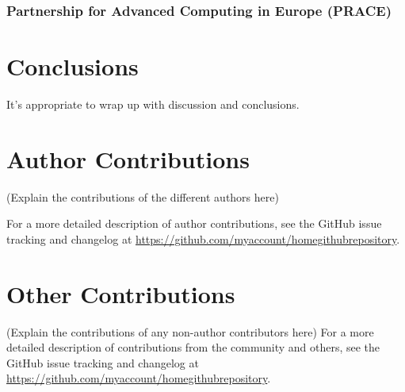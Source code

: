 \documentclass[9pt,review]{livecoms}
\newcommand{\githubrepository}{\url{https://github.com/myaccount/homegithubrepository}}  %
\begin{document}
\subsubsection{Partnership for Advanced Computing in Europe (PRACE)}



\section{Conclusions}

It's appropriate to wrap up with discussion and conclusions.





\section*{Author Contributions}
%

(Explain the contributions of the different authors here)

For a more detailed description of author contributions,
see the GitHub issue tracking and changelog at \githubrepository.

\section*{Other Contributions}
%

(Explain the contributions of any non-author contributors here)
For a more detailed description of contributions from the community and others, see the GitHub issue tracking and changelog at \githubrepository.
\end{document}
